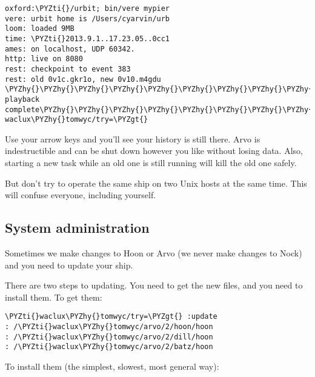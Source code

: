 \begin{framed_shaded}
\begin{Verbatim}[fontsize=\relsize{-2.5},fontseries=b,commandchars=\\\{\}]
oxford:\PYZti{}/urbit; bin/vere mypier
vere: urbit home is /Users/cyarvin/urb
loom: loaded 9MB
time: \PYZti{}2013.9.1..17.23.05..0cc1
ames: on localhost, UDP 60342.
http: live on 8080
rest: checkpoint to event 383
rest: old 0v1c.gkr1o, new 0v10.m4gdu
\PYZhy{}\PYZhy{}\PYZhy{}\PYZhy{}\PYZhy{}\PYZhy{}\PYZhy{}\PYZhy{}\PYZhy{}\PYZhy{}\PYZhy{}\PYZhy{}\PYZhy{}\PYZhy{}\PYZhy{}\PYZhy{} playback complete\PYZhy{}\PYZhy{}\PYZhy{}\PYZhy{}\PYZhy{}\PYZhy{}\PYZhy{}\PYZhy{}\PYZhy{}\PYZhy{}\PYZhy{}\PYZhy{}\PYZhy{}\PYZhy{}\PYZhy{}\PYZhy{}
waclux\PYZhy{}tomwyc/try=\PYZgt{}
\end{Verbatim}
\end{framed_shaded}

Use your arrow keys and you'll see your history is still there.
Arvo is indestructible and can be shut down however you like
without losing data.  Also, starting a new task while an old
one is still running will kill the old one safely.

But don't try to operate the same ship on two Unix hosts at the
same time.  This will confuse everyone, including yourself.

\subsection{System administration}

Sometimes we make changes to Hoon or Arvo (we never make changes
to Nock) and you need to update your ship.

There are two steps to updating.  You need to get the new files,
and you need to install them.  To get them:

\begin{framed_shaded}
\begin{Verbatim}[fontsize=\relsize{-2.5},fontseries=b,commandchars=\\\{\}]
\PYZti{}waclux\PYZhy{}tomwyc/try=\PYZgt{} :update
: /\PYZti{}waclux\PYZhy{}tomwyc/arvo/2/hoon/hoon
: /\PYZti{}waclux\PYZhy{}tomwyc/arvo/2/dill/hoon
: /\PYZti{}waclux\PYZhy{}tomwyc/arvo/2/batz/hoon
\end{Verbatim}
\end{framed_shaded}

To install them (the simplest, slowest, most general way):


